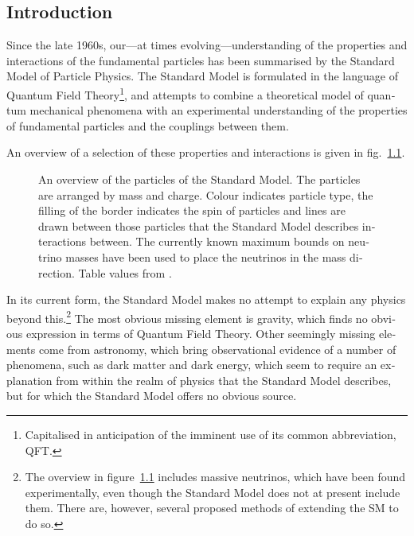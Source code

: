 \begin{english}
\clearpage

\tableofcontents
\mainmatter

\chapter{Introduction}

Since the late 1960s, our---at times evolving---understanding of the properties and interactions of the fundamental particles has been summarised by the Standard Model of Particle Physics. The Standard Model is formulated in the language of Quantum Field Theory\footnote{Capitalised in anticipation of the imminent use of its common abbreviation, QFT.}, and attempts to combine a theoretical model of quantum mechanical phenomena with an experimental understanding of the properties of fundamental particles and the couplings between them.

An overview of a selection of these properties and interactions is given in fig.~\ref{SMsum}.

\begin{figure}[htp]
\begin{minipage}[b]{.745\textwidth}

\end{minipage}
\hfill\begin{minipage}[b]{.25\textwidth}
\caption{An overview of the particles of the Standard Model. The particles are arranged by mass and charge. Colour indicates particle type, the filling of the border indicates the spin of particles and lines are drawn between those particles that the Standard Model describes interactions between. The currently known maximum bounds on neutrino masses have been used to place the neutrinos in the mass direction. Table values from \cite{wikism}.\label{SMsum}}
\end{minipage}
\end{figure}

In its current form, the Standard Model makes no attempt to explain any physics beyond this.\footnote{The overview in figure~\ref{SMsum} includes massive neutrinos, which have been found experimentally, even though the Standard Model does not at present include them. There are, however, several proposed methods of extending the SM to do so.} The most obvious missing element is gravity, which finds no obvious expression in terms of Quantum Field Theory. Other seemingly missing elements come from astronomy, which bring observational evidence of a number of phenomena, such as dark matter and dark energy, which seem to require an explanation from within the realm of physics that the Standard Model describes, but for which the Standard Model offers no obvious source.


\end{english}
